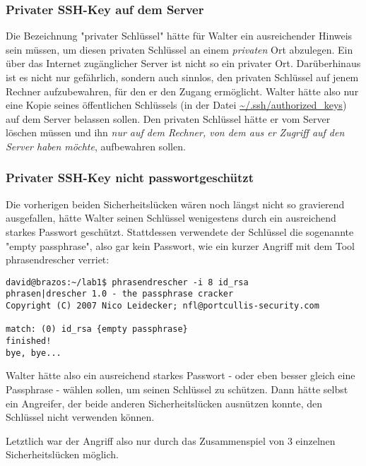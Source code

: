 \subsubsection{Privater SSH-Key auf dem Server}
Die Bezeichnung "privater Schlüssel" hätte für Walter ein ausreichender Hinweis sein müssen, um diesen privaten Schlüssel an einem \emph{privaten} Ort abzulegen. Ein über das Internet zugänglicher Server ist nicht so ein privater Ort. Darüberhinaus ist es nicht nur gefährlich, sondern auch sinnlos, den privaten Schlüssel auf jenem Rechner aufzubewahren, für den er den Zugang ermöglicht.
Walter hätte also nur eine Kopie seines öffentlichen Schlüssels (in der Datei \url{~/.ssh/authorized_keys}) auf dem Server belassen sollen. Den privaten Schlüssel hätte er vom Server löschen müssen und ihn \emph{nur auf dem Rechner, von dem aus er Zugriff auf den Server haben möchte}, aufbewahren sollen.

\subsubsection{Privater SSH-Key nicht passwortgeschützt}
Die vorherigen beiden Sicherheitslücken wären noch längst nicht so gravierend ausgefallen, hätte Walter seinen Schlüssel wenigestens durch ein ausreichend starkes Passwort geschützt. Stattdessen verwendete der Schlüssel die sogenannte "empty passphrase", also gar kein Passwort, wie ein kurzer Angriff mit dem Tool phrasendrescher verriet:

\begin{lstlisting}
david@brazos:~/lab1$ phrasendrescher -i 8 id_rsa
phrasen|drescher 1.0 - the passphrase cracker
Copyright (C) 2007 Nico Leidecker; nfl@portcullis-security.com

match: (0) id_rsa {empty passphrase}
finished!
bye, bye...
\end{lstlisting}

Walter hätte also ein ausreichend starkes Passwort - oder eben besser gleich eine Passphrase - wählen sollen, um seinen Schlüssel zu schützen. Dann hätte selbst ein Angreifer, der beide anderen Sicherheitslücken ausnützen konnte, den Schlüssel nicht verwenden können.

Letztlich war der Angriff also nur durch das Zusammenspiel von 3 einzelnen Sicherheitslücken möglich.

